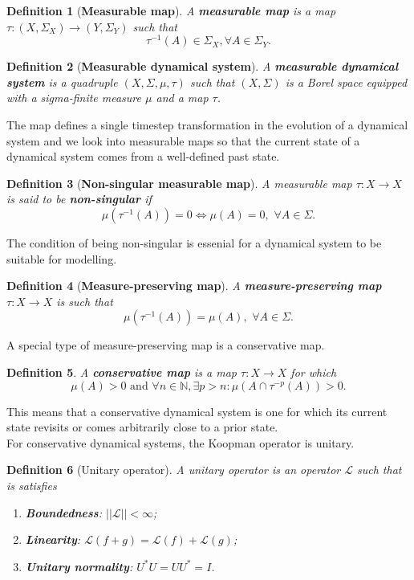 \documentclass[]{article}
\newtheorem{definition}{Definition}
\begin{document}
\begin{definition}[\textbf{Measurable map}]
A \textbf{measurable map} is a map $\tau: (X,\Sigma_X) \to (Y, \Sigma_Y)$ such that 
\begin{equation}
	\tau^{-1}(A) \in \Sigma_X, \forall A \in \Sigma_Y.
\end{equation}
\end{definition}
\begin{definition}[\textbf{Measurable dynamical system}]
A \textbf{measurable dynamical system} is a quadruple $(X,\Sigma,\mu,\tau)$ such that $(X,\Sigma)$ is a Borel space equipped with a sigma-finite measure $\mu$ and a map $\tau$.
\end{definition}
The map defines a single timestep transformation in the evolution of a dynamical system and we look into measurable maps so that the current state of a dynamical system comes from a well-defined past state.
\begin{definition}[\textbf{Non-singular measurable map}]
A measurable map $\tau:X \to X$ is said to be \textbf{non-singular} if 
\begin{equation}
	\mu(\tau^{-1}(A))=0 \iff \mu(A)=0, \,\, \forall A \in \Sigma.
\end{equation}
\end{definition}
The condition of being non-singular is essenial for a dynamical system to be suitable for modelling.
\begin{definition}[\textbf{Measure-preserving map}]
A \textbf{measure-preserving map} $\tau:X \to X$ is such that
\begin{equation}
	\mu(\tau^{-1}(A))=\mu(A), \,\, \forall A \in \Sigma.
\end{equation}
\end{definition}
A special type of measure-preserving map is a conservative map.
\begin{definition}
A \textbf{conservative map} is a map $\tau:X \to X$ for which
\begin{equation}
	\mu(A) > 0 \,\, \text{and} \,\, \forall n \in \mathbb{N}, \exists p > n: \mu(A \cap \tau^{-p}(A)) > 0.
\end{equation}
\end{definition}
This means that a conservative dynamical system is one for which its current state revisits or comes arbitrarily close to a prior state. \\
For conservative dynamical systems, the Koopman operator is unitary.
\begin{definition}[Unitary operator]
A unitary operator is an operator $\mathcal{L}$ such that is satisfies
\begin{enumerate}
	\item \textbf{Boundedness}: $||\mathcal{L}||<\infty$;
	\item \textbf{Linearity}: $\mathcal{L}(f+g)=\mathcal{L}(f)+\mathcal{L}(g)$;
	\item \textbf{Unitary normality}: $U^*U=UU^*=I$.
\end{enumerate}
\end{definition}
\end{document}
